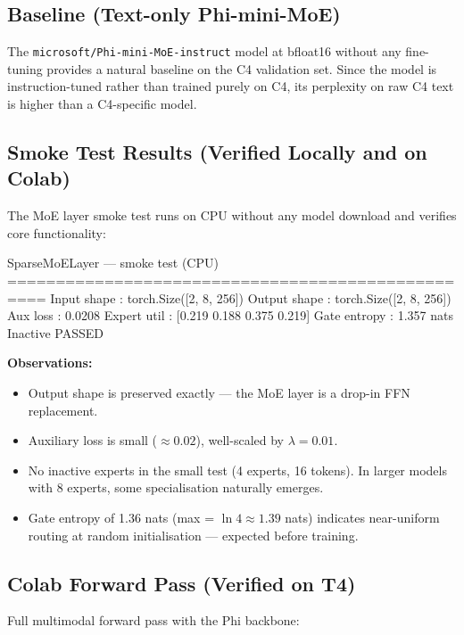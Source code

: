 \documentclass[11pt]{article}
\begin{document}
\subsection{Baseline (Text-only Phi-mini-MoE)}


The \texttt{microsoft/Phi-mini-MoE-instruct} model at bfloat16 without any fine-tuning provides a natural baseline on the C4 validation set. Since the model is instruction-tuned rather than trained purely on C4, its perplexity on raw C4 text is higher than a C4-specific model.


\subsection{Smoke Test Results (Verified Locally and on Colab)}


The MoE layer smoke test runs on CPU without any model download and verifies core functionality:


\begin{CodeBlock}
SparseMoELayer — smoke test (CPU)
==================================================
  Input  shape : torch.Size([2, 8, 256])
  Output shape : torch.Size([2, 8, 256])
  Aux loss     : 0.0208
  Expert util  : [0.219 0.188 0.375 0.219]
  Gate entropy : 1.357 nats
  Inactive %
  PASSED
\end{CodeBlock}


\textbf{Observations:}

\begin{itemize}[leftmargin=*]
\item Output shape is preserved exactly — the MoE layer is a drop-in FFN replacement.
\item Auxiliary loss is small ($\approx 0.02$), well-scaled by $\lambda = 0.01$.
\item No inactive experts in the small test (4 experts, 16 tokens). In larger models with 8 experts, some specialisation naturally emerges.
\item Gate entropy of 1.36 nats (max = $\ln 4 \approx 1.39$ nats) indicates near-uniform routing at random initialisation — expected before training.

\end{itemize}
\subsection{Colab Forward Pass (Verified on T4)}


Full multimodal forward pass with the Phi backbone:
\end{document}
